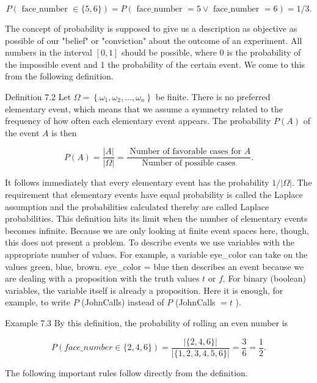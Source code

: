 \documentclass[10pt]{book}
\begin{document}
$$
P(\text { face_number } \in\{5,6\})=P(\text { face_number }=5 \vee \text { face_number }=6)=1 / 3 .
$$

The concept of probability is supposed to give us a description as objective as possible of our "belief" or "conviction" about the outcome of an experiment. All numbers in the interval $[0,1]$ should be possible, where 0 is the probability of the impossible event and 1 the probability of the certain event. We come to this from the following definition.

Definition 7.2 Let $\Omega=\left\{\omega_{1}, \omega_{2}, \ldots, \omega_{n}\right\}$ be finite. There is no preferred elementary event, which means that we assume a symmetry related to the frequency of how often each elementary event appears. The probability $P(A)$ of the event $A$ is then

$$
P(A)=\frac{|A|}{|\Omega|}=\frac{\text { Number of favorable cases for } A}{\text { Number of possible cases }} .
$$

It follows immediately that every elementary event has the probability $1 /|\Omega|$. The requirement that elementary events have equal probability is called the Laplace assumption and the probabilities calculated thereby are called Laplace probabilities. This definition hits its limit when the number of elementary events becomes infinite. Because we are only looking at finite event spaces here, though, this does not present a problem. To describe events we use variables with the appropriate number of values. For example, a variable eye\_color can take on the values green, blue, brown. eye\_color = blue then describes an event because we are dealing with a proposition with the truth values $t$ or $f$. For binary (boolean) variables, the variable itself is already a proposition. Here it is enough, for example, to write $P$ (JohnCalls) instead of $P$ (JohnCalls $=t$ ).

Example 7.3 By this definition, the probability of rolling an even number is

$$
P\left(f a c e \_n u m b e r \in\{2,4,6\}\right)=\frac{|\{2,4,6\}|}{|\{1,2,3,4,5,6\}|}=\frac{3}{6}=\frac{1}{2} .
$$

The following important rules follow directly from the definition.
\end{document}
